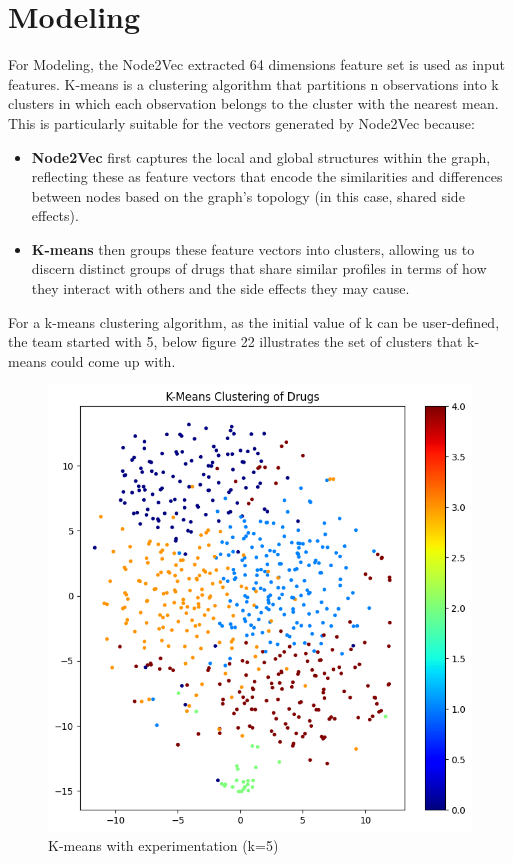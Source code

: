 \documentclass[journal,transmag]{J-NaNA}
\begin{document}
\section{Modeling}
For Modeling, the Node2Vec extracted 64 dimensions feature set is used as input features. K-means is a clustering algorithm that partitions n observations into k clusters in which each observation belongs to the cluster with the nearest mean. This is particularly suitable for the vectors generated by Node2Vec because:
\begin{itemize}
    \item \textbf{Node2Vec} first captures the local and global structures within the graph, reflecting these as feature vectors that encode the similarities and differences between nodes based on the graph's topology (in this case, shared side effects).
    \item \textbf{K-means} then groups these feature vectors into clusters, allowing us to discern distinct groups of drugs that share similar profiles in terms of how they interact with others and the side effects they may cause.
\end{itemize}
For a k-means clustering algorithm, as the initial value of k can be user-defined, the team started with 5, below figure 22 illustrates the set of clusters that k-means could come up with.
\begin{figure}[htbp]
\centering
\includegraphics[width=\linewidth]{kmeans_initial.png} 
\caption{K-means with experimentation (k=5)} 
\label{fig: Initial K-means clustering} %
\end{figure}
\end{document}
